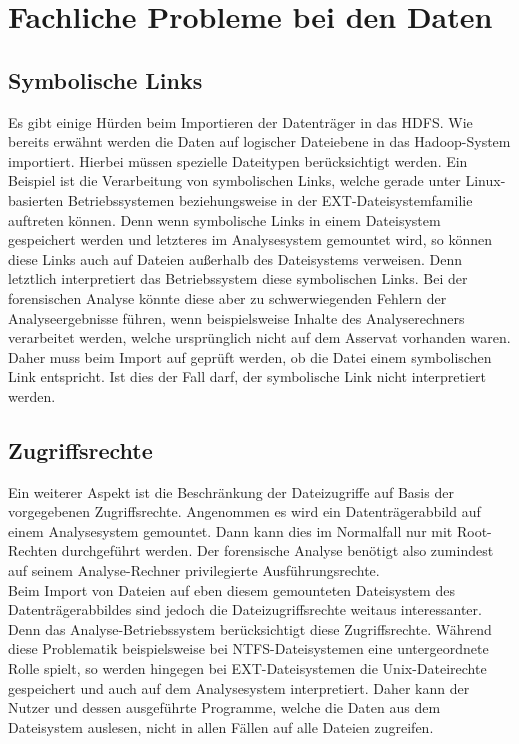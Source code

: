 \section{Fachliche Probleme bei den Daten}

\subsection{Symbolische Links}
Es gibt einige Hürden beim Importieren der Datenträger in das HDFS. Wie bereits erwähnt werden die Daten auf logischer Dateiebene in das Hadoop-System importiert. Hierbei müssen spezielle Dateitypen berücksichtigt werden. Ein Beispiel ist die Verarbeitung von symbolischen Links, welche gerade unter Linux-basierten Betriebssystemen beziehungsweise in der EXT-Dateisystemfamilie auftreten können. Denn wenn symbolische Links in einem Dateisystem gespeichert werden und letzteres im Analysesystem gemountet wird, so können diese Links auch auf Dateien außerhalb des Dateisystems verweisen. Denn letztlich interpretiert das Betriebssystem diese symbolischen Links. Bei der forensischen Analyse könnte diese aber zu schwerwiegenden Fehlern der Analyseergebnisse führen, wenn beispielsweise Inhalte des Analyserechners verarbeitet werden, welche ursprünglich nicht auf dem Asservat vorhanden waren. Daher muss beim Import auf geprüft werden, ob die Datei einem symbolischen Link entspricht. Ist dies der Fall darf, der symbolische Link nicht interpretiert werden. 

\subsection{Zugriffsrechte}
Ein weiterer Aspekt ist die Beschränkung der Dateizugriffe auf Basis der vorgegebenen Zugriffsrechte. Angenommen es wird ein Datenträgerabbild auf einem Analysesystem gemountet.
Dann kann dies im Normalfall nur mit Root-Rechten durchgeführt werden. 
Der forensische Analyse benötigt also zumindest auf seinem Analyse-Rechner 
privilegierte Ausführungsrechte.\\
Beim Import von Dateien auf eben diesem gemounteten Dateisystem des Datenträgerabbildes sind jedoch die Dateizugriffsrechte weitaus interessanter. Denn das Analyse-Betriebssystem berücksichtigt diese Zugriffsrechte. Während diese Problematik beispielsweise bei NTFS-Dateisystemen eine untergeordnete Rolle spielt, so werden hingegen bei EXT-Dateisystemen die Unix-Dateirechte gespeichert und auch auf dem Analysesystem interpretiert. 
Daher kann der Nutzer und dessen ausgeführte Programme, welche die Daten aus dem Dateisystem auslesen, nicht in allen Fällen auf alle Dateien zugreifen.\\

